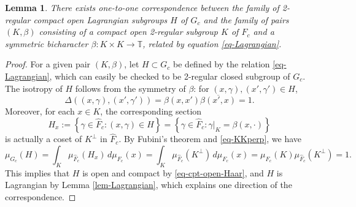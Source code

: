 \documentclass[12pt,reqno]{amsart}
\newtheorem{lem}[thm]{Lemma}
\theoremstyle{definition}
\theoremstyle{definition}
\theoremstyle{definition}
\numberwithin{thm}{section}
\numberwithin{equation}{section}
\newcommand{\set}[1]{\left\{#1\right\}}
\newcommand{\tor}{\mathbb{T}}
\begin{document}
\begin{lem} \label{lem-Lag-symmbichar}
There exists one-to-one correspondence between the family of 2-regular compact open Lagrangian subgroups $H$ of $G_c$ and the family of pairs $(K,\beta)$ consisting of a compact open 2-regular subgroup $K$ of $F_c$ and a symmetric bicharacter $\beta:K\times K\to \tor$, related by equation \eqref{eq-Lagrangian}.
\end{lem}
\begin{proof}
For a given pair $(K,\beta)$, let $H\subset G_c$ be defined by the relation \eqref{eq-Lagrangian}, which can easily be checked to be 2-regular closed subgroup of $G_c$.
The isotropy of $H$ follows from the symmetry of $\beta$: for $(x,\gamma), (x',\gamma')\in H$,
    $$\Delta((x,\gamma),(x',\gamma'))=\beta(x,x')\overline{\beta(x',x)}=1.$$
Moreover, for each $x\in K$, the corresponding section 
    \begin{equation}\label{eq-Hsection}
    H_x:=\set{\gamma\in \widehat{F}_c:(x,\gamma)\in H}=\set{\gamma\in \widehat{F}_c:\gamma|_K=\beta(x,\cdot)}    
    \end{equation}
is actually a coset of $K^{\perp}$ in $\widehat{F}_c$. By Fubini's theorem and \eqref{eq-KKperp}, we have
    $$\mu_{G_c}(H)=\int_K \mu_{\widehat{F}_c}(H_x) \,d\mu_{F_c}(x)=\int_K \mu_{\widehat{F}_c}(K^{\perp})\,d\mu_{F_c}(x)=\mu_{F_c}(K)\mu_{\widehat{F}_c}(K^{\perp})=1.$$
This implies that $H$ is open and compact by \eqref{eq-cpt-open-Haar}, and $H$ is Lagrangian by Lemma \ref{lem-Lagrangian}, which explains one direction of the correspondence.


\end{proof}
\end{document}
